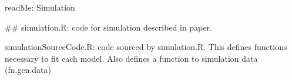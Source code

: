 readMe: Simulation


##
simulation.R: code for simulation described in paper. 

simulationSourceCode.R: code sourced by simulation.R. This defines functions necessary to fit each model. Also defines a function to simulation data (fn.gen.data)

